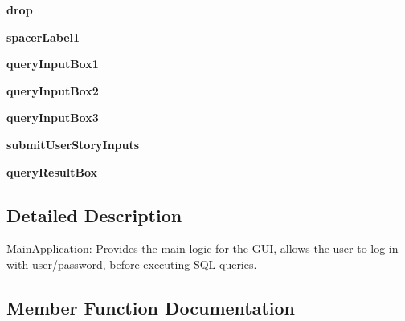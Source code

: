 \begin{DoxyCompactItemize}
{\bfseries drop}
\item 
\hypertarget{classmain_g_u_i_1_1_main_application_a9e0d95c2146f4c3c648ebc613854b0ba}{}\label{classmain_g_u_i_1_1_main_application_a9e0d95c2146f4c3c648ebc613854b0ba} 
{\bfseries spacer\+Label1}
\item 
\hypertarget{classmain_g_u_i_1_1_main_application_af20185ebf2a33d11519f10aa53abce17}{}\label{classmain_g_u_i_1_1_main_application_af20185ebf2a33d11519f10aa53abce17} 
{\bfseries query\+Input\+Box1}
\item 
\hypertarget{classmain_g_u_i_1_1_main_application_ac74a832fe09a62ce7b1115cc88928f12}{}\label{classmain_g_u_i_1_1_main_application_ac74a832fe09a62ce7b1115cc88928f12} 
{\bfseries query\+Input\+Box2}
\item 
\hypertarget{classmain_g_u_i_1_1_main_application_a07bc20d647585d2a0c23943aef42b570}{}\label{classmain_g_u_i_1_1_main_application_a07bc20d647585d2a0c23943aef42b570} 
{\bfseries query\+Input\+Box3}
\item 
\hypertarget{classmain_g_u_i_1_1_main_application_a6cc2b89071419d90c1b98fa8d95df2df}{}\label{classmain_g_u_i_1_1_main_application_a6cc2b89071419d90c1b98fa8d95df2df} 
{\bfseries submit\+User\+Story\+Inputs}
\item 
\hypertarget{classmain_g_u_i_1_1_main_application_a86dfd0f97f8952cdde81bf89efab6e68}{}\label{classmain_g_u_i_1_1_main_application_a86dfd0f97f8952cdde81bf89efab6e68} 
{\bfseries query\+Result\+Box}
\end{DoxyCompactItemize}


\subsection{Detailed Description}
\begin{DoxyVerb}MainApplication: Provides the main logic for the GUI, allows the
    user to log in with user/password, before executing SQL queries. \end{DoxyVerb}
 

\subsection{Member Function Documentation}
\hypertarget{classmain_g_u_i_1_1_main_application_adfb6937d77ab2cde3eb371057482ab6e}{}\label{classmain_g_u_i_1_1_main_application_adfb6937d77ab2cde3eb371057482ab6e} 
